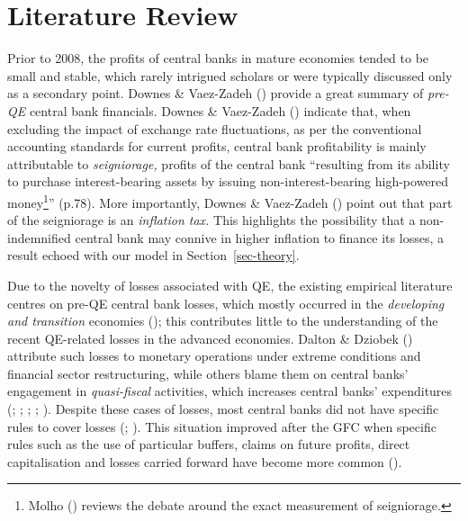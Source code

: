 \documentclass[
  a4paper,
  abstract=true]{scrartcl}
\theoremstyle{definition}
\begin{document}
\section{Literature Review}\label{sec-litreview}

Prior to 2008, the profits of central banks in mature economies tended
to be small and stable, which rarely intrigued scholars or were
typically discussed only as a secondary point. Downes \& Vaez-Zadeh
() provide a great summary of
\emph{pre-QE} central bank financials. Downes \& Vaez-Zadeh
() indicate that, when excluding the
impact of exchange rate fluctuations, as per the conventional accounting
standards for current profits, central bank profitability is mainly
attributable to \emph{seigniorage,} profits of the central bank
``resulting from its ability to purchase interest-bearing assets by
issuing non-interest-bearing high-powered money\footnote{Molho
  () reviews the debate around the exact
  measurement of seigniorage.}'' (p.78). More importantly, Downes \&
Vaez-Zadeh () point out that part of the
seigniorage is an \emph{inflation tax.} This highlights the possibility
that a non-indemnified central bank may connive in higher inflation to
finance its losses, a result echoed with our model in
Section~\ref{sec-theory}.

Due to the novelty of losses associated with QE, the existing empirical
literature centres on pre-QE central bank losses, which mostly occurred
in the \emph{developing and transition} economies
(); this contributes little
to the understanding of the recent QE-related losses in the advanced
economies. Dalton \& Dziobek () attribute
such losses to monetary operations under extreme conditions and
financial sector restructuring, while others blame them on central
banks' engagement in \emph{quasi-fiscal} activities, which increases
central banks' expenditures (; ;
;
;
). Despite these cases of
losses, most central banks did not have specific rules to cover losses
(;
). This situation
improved after the GFC when specific rules such as the use of particular
buffers, claims on future profits, direct capitalisation and losses
carried forward have become more common ().
\end{document}
